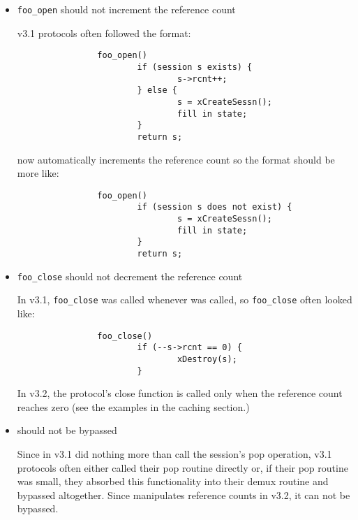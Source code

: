 \begin{itemize}
\item{}
{\tt foo\_open} should not increment the reference count

v3.1 protocols often followed the format:

\begin{verbatim}
                foo_open()
                        if (session s exists) {
                                s->rcnt++;
                        } else {
                                s = xCreateSessn();
                                fill in state;                        
                        }
                        return s;
\end{verbatim}

        \xOpen{} now automatically increments the reference count so the
        format should be more like:

\begin{verbatim}
                foo_open()
                        if (session s does not exist) {
                                s = xCreateSessn();
                                fill in state;                        
                        }
                        return s;
\end{verbatim}        

\item{}
{\tt foo\_close} should not decrement the reference count
        
        In v3.1, {\tt foo\_close} was called whenever \xClose{} was called, so
        {\tt foo\_close} often looked like:

\begin{verbatim}
                foo_close()
                        if (--s->rcnt == 0) {
                                xDestroy(s);
                        }
\end{verbatim}
        
        In v3.2, the protocol's close function is called only when the
        reference count reaches zero (see the examples in the caching section.)


\item{}
\xPop{} should not be bypassed

        Since \xPop{} in v3.1 did nothing more than call the session's
        pop operation, v3.1 protocols often either called their pop
        routine directly or, if their pop routine was small, they
        absorbed this functionality into their demux routine and
        bypassed \xPop{} altogether.  Since \xPop{} 
        manipulates reference counts in v3.2, it
        can not be bypassed.



\end{itemize}
